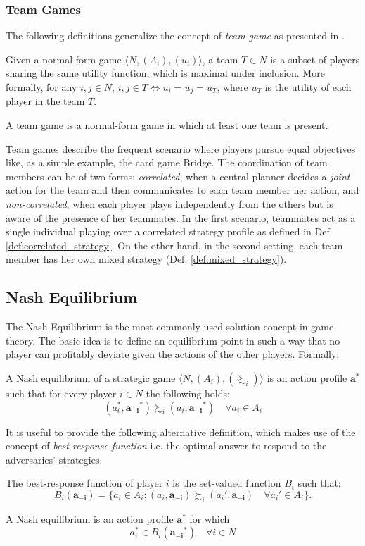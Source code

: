 \subsubsection{Team Games}
The following definitions generalize the concept of \textit{team game} as presented in \citep{von1997}.
\begin{definition}\label{def:team}
	Given a normal-form game $\langle N,(A_{i}),(u_{i})\rangle$, a team $T\in N$ is a subset of players sharing the same utility function, which is maximal under inclusion. More formally, for any $i,j \in N$, $i,j\in T \Leftrightarrow u_{i}=u_{j}=u_{T}$, where $u_{T}$ is the utility of each player in the team $T$.
\end{definition} 
\begin{definition}
	A team game is a normal-form game in which at least one team is present.
\end{definition}
Team games describe the frequent scenario where players pursue equal objectives like, as a simple example, the card game Bridge. The coordination of team members can be of two forms: \textit{correlated}, when a central planner decides a \textit{joint} action for the team and then communicates to each team member her action, and \textit{non-correlated}, when each player plays independently from the others but is aware of the presence of her teammates. In the first scenario, teammates act as a single individual playing over a correlated strategy profile as defined in Def. \ref{def:correlated_strategy}. On the other hand, in the second setting, each team member has her own mixed strategy (Def. \ref{def:mixed_strategy}).

\subsection{Nash Equilibrium} 
The Nash Equilibrium is the most commonly used solution concept in game theory. The basic idea is to define an equilibrium point in such a way that no player can profitably deviate given the actions of the other players. Formally:
\begin{definition}
	A Nash equilibrium of a strategic game $\langle N,(A_{i}),(\succsim_{i})\rangle$ is an action profile $\mathbf{a}^{\ast}$ such that for every player $i \in N$ the following holds: $$(a_{i}^{\ast},\mathbf{a_{-i}}^{\ast})\succsim_{i}(a_{i},\mathbf{a_{-i}}^{\ast})\quad\forall a_{i} \in A_{i}$$
\end{definition}
It is useful to provide the following alternative definition, which makes use of the concept of \textit{best-response function} i.e. the optimal answer to respond to the adversaries' strategies.
\begin{definition}
	The best-response function of player $i$ is the set-valued function $B_{i}$ such that: $$B_{i}(\mathbf{a_{-i}})=\{a_{i}\in A_{i}:(a_{i},\mathbf{a_{-i}})\succsim_{i}(a_{i}',\mathbf{a_{-i}})\quad\forall a_{i}'\in A_{i}\}.$$
\end{definition}
\begin{definition}
	A Nash equilibrium is an action profile $\mathbf{a}^{\ast}$ for which $$a_{i}^{\ast}\in B_{i}(\mathbf{a_{-i}}^{\ast}) \quad \forall i \in N$$
\end{definition}

